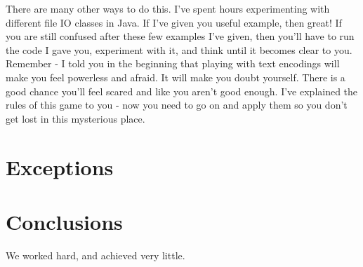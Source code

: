 \documentclass[12pt]{article}
\begin{document}
There are many other ways to do this. I've spent hours experimenting with different file IO classes in Java. If I've given you useful example, then great! If you are still confused after these few examples I've given, then you'll have to run the code I gave you, experiment with it, and think until it becomes clear to you. Remember -  I told you in the beginning that playing with text encodings will make you feel powerless and afraid. It will make you doubt yourself. There is a good chance you'll feel scared and like you aren't good enough. I've explained the rules of this game to you - now you need to go on and apply them so you don't get lost in this mysterious place.

\section{Exceptions}

\section{Conclusions}\label{conclusions}
We worked hard, and achieved very little.
\end{document}
